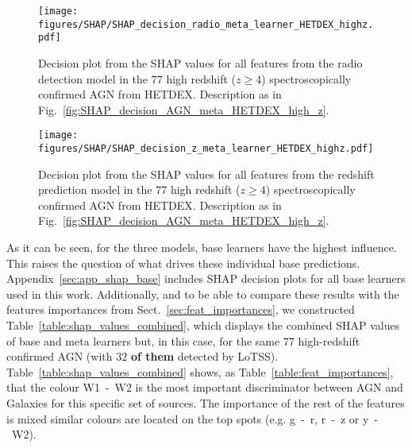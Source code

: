 \documentclass{aa}
\begin{document}
\begin{figure}
   \centering
   \texttt{[image: figures/SHAP/SHAP\_decision\_radio\_meta\_learner\_HETDEX\_highz.pdf]}
   \caption{Decision plot from the SHAP values for all features from the radio detection model in the $77$ high redshift ($z \geq 4$) spectroscopically confirmed AGN from HETDEX. Description as in Fig.~\ref{fig:SHAP_decision_AGN_meta_HETDEX_high_z}.}
   \label{fig:SHAP_decision_radio_meta_HETDEX_high_z}
\end{figure}

\begin{figure}
   \centering
   \texttt{[image: figures/SHAP/SHAP\_decision\_z\_meta\_learner\_HETDEX\_highz.pdf]}
   \caption{Decision plot from the SHAP values for all features from the redshift prediction model in the $77$ high redshift ($z \geq 4$) spectroscopically confirmed AGN from HETDEX. Description as in Fig.~\ref{fig:SHAP_decision_AGN_meta_HETDEX_high_z}.}
   \label{fig:SHAP_decision_z_meta_HETDEX_high_z}
\end{figure}

As it can be seen, for the three models, base learners have the highest influence. This raises the question of what drives these individual base predictions. Appendix~\ref{sec:app_shap_base} includes SHAP decision plots for all base learners used in this work. Additionally, and to be able to compare these results with the features importances from Sect.~\ref{sec:feat_importances}, we constructed Table~\ref{table:shap_values_combined}, which displays the combined SHAP values of base and meta learners but, in this case, for the same $77$ high-redshift confirmed AGN (with $32$ \textbf{of them} detected by LoTSS). Table~\ref{table:shap_values_combined} shows, as Table~\ref{table:feat_importances}, that the colour W1~-~W2 is the most important discriminator between AGN and Galaxies for this specific set of sources. The importance of the rest of the features is mixed similar colours are located on the top spots (e.g. g~-~r, r~-~z or y~-~W2).
\end{document}
